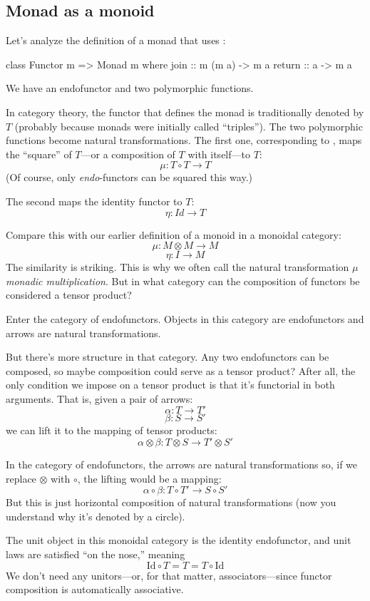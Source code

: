 \documentclass[DaoFP]{subfiles}
\begin{document}
\subsection{Monad as a monoid}

Let's analyze the definition of a monad that uses :
\begin{haskell}
class Functor m => Monad m where
  join :: m (m a) -> m a
  return :: a -> m a
\end{haskell}
We have an endofunctor  and two polymorphic functions. 

In category theory, the functor that defines the monad is traditionally denoted by $T$ (probably because monads were initially called ``triples''). The two polymorphic functions become natural transformations. The first one, corresponding to , maps the ``square'' of $T$---or a composition of $T$ with itself---to $T$:
\[ \mu \colon T \circ T \to T \]
(Of course, only \emph{endo}-functors can be squared this way.) 

The second maps the identity functor to $T$:
\[ \eta \colon Id \to T \]

Compare this with our earlier definition of a monoid in a monoidal category:
\[ \mu \colon M \otimes M \to M \]
\[ \eta \colon I \to M \]
The similarity is striking. This is why we often call the natural transformation $\mu$ \emph{monadic multiplication}. But in what category can the composition of functors be considered a tensor product? 

Enter the category of endofunctors. Objects in this category are endofunctors and arrows are natural transformations. 

But there's more structure in that category. Any two endofunctors can be composed, so maybe composition could serve as a tensor product? After all, the only condition we impose on a tensor product is that it's functorial in both arguments. That is, given a pair of arrows:
 \[ \alpha \colon T \to T'\]
 \[ \beta \colon S \to S' \]
 we can lift it to the mapping of tensor products:
 \[ \alpha \otimes \beta \colon T \otimes S \to T' \otimes S' \]
 
 In the category of endofunctors, the arrows are natural transformations so, if we replace $\otimes$ with $\circ$, the lifting would be a mapping:
\[ \alpha \circ \beta \colon T \circ T' \to S \circ S' \]
But this is just horizontal composition of natural transformations (now you understand why it's denoted by a circle).

The unit object in this monoidal category is the identity endofunctor, and unit laws are satisfied ``on the nose,'' meaning
\[ \text{Id} \circ T = T = T \circ \text{Id}\]
We don't need any unitors---or, for that matter, associators---since functor composition is automatically associative. 
\end{document}
